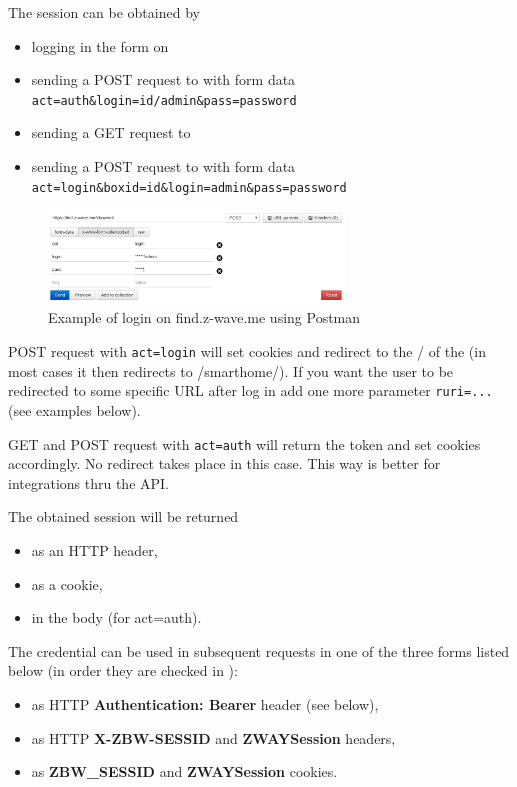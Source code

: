 The session can be obtained by
\begin{itemize}
\item logging in the form on 
\item sending a POST request to  with form data \texttt{act=auth\&login=id/admin\&pass=password}
\item sending a GET request to 
\item sending a POST request to  with form data \texttt{act=login\&boxid=id\&login=admin\&pass=password}
\end{itemize}

\begin{figure}
\begin{center}
\includegraphics[width=0.7\textwidth]{pngs/cap13/find-login-postman.png}
\caption{Example of login on find.z-wave.me using Postman}
\label{authenticatioln_remote_find}
\end{center}
\end{figure}

POST request with \texttt{act=login} will set cookies and redirect to the / of the \zway (in most cases it then redirects to /smarthome/).
If you want the user to be redirected to some specific URL after log in add one more parameter \texttt{ruri=...} (see examples below).

GET and POST request with \texttt{act=auth} will return the token and set cookies accordingly. No redirect takes place in this case. This way is better for integrations thru the API.

The obtained session will be returned
\begin{itemize}
\item as an HTTP header,
\item as a cookie,
\item in the body (for act=auth).
\end{itemize}

The credential can be used in subsequent requests in one of the three forms listed below (in order they are checked in \zway):
\begin{itemize}
\item as HTTP \textbf{Authentication: Bearer} header (see below),
\item as HTTP \textbf{X-ZBW-SESSID} and \textbf{ZWAYSession} headers,
\item as \textbf{ZBW\_SESSID} and \textbf{ZWAYSession} cookies.
\end{itemize}

